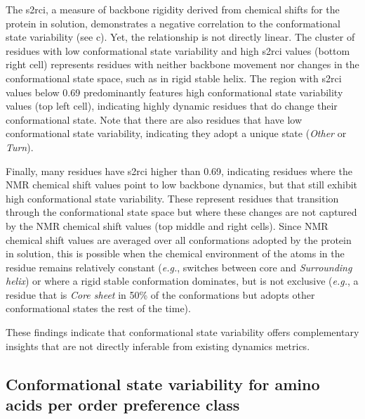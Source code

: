 The \gls{s2rci}, a measure of backbone rigidity derived from chemical shifts for the protein in solution, demonstrates a negative correlation to the conformational state variability (see  c). Yet, the relationship is not directly linear. The cluster of residues with low conformational state variability and high \gls{s2rci} values (bottom right cell) represents residues with neither backbone movement nor changes in the conformational state space, such as in rigid stable helix. The region with \gls{s2rci} values below 0.69 predominantly features high conformational state variability values (top left cell), indicating highly dynamic residues that do change their conformational state. Note that there are also residues that have low conformational state variability, indicating they adopt a unique state (\textit{Other} or \textit{Turn}).

Finally, many residues have \gls{s2rci} higher than 0.69, indicating residues where the NMR chemical shift values point to low backbone dynamics, but that still exhibit high conformational state variability. These represent residues that transition through the conformational state space but where these changes are not captured by the NMR chemical shift values (top middle and right cells). Since NMR chemical shift values are averaged over all conformations adopted by the protein in solution, this is possible when the chemical environment of the atoms in the residue remains relatively constant (\textit{e.g.}, switches between core and \textit{Surrounding helix}) or where a rigid stable conformation dominates, but is not exclusive (\textit{e.g.}, a residue that is \textit{Core sheet} in 50\% of the conformations but adopts other conformational states the rest of the time). 

These findings indicate that conformational state variability offers complementary insights that are not directly inferable from existing dynamics metrics.

\subsection{Conformational state variability for amino acids per order preference class} \label{section:aa_preference}


